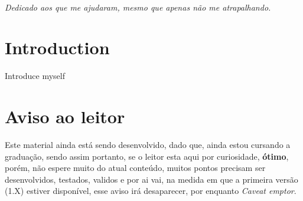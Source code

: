 \documentclass[a4paper, notoc]{tufte-book}
\begin{document}

\tableofcontents %


\listoffigures %


\listoftables %


\cleardoublepage
~\vfill
\begin{doublespace}
\noindent\fontsize{18}{22}\selectfont\itshape
\nohyphenation
Dedicado aos que me ajudaram, mesmo que apenas não me atrapalhando.
\end{doublespace}
\vfill
\vfill


\cleardoublepage
\chapter*{Introduction} %
Introduce myself


\cleardoublepage
\chapter*{Aviso ao leitor}
Este material ainda está sendo desenvolvido, dado que, ainda estou cursando a
graduação, sendo assim portanto, se o leitor esta aqui por curiosidade,
\textbf{ótimo}, porém, não espere muito do atual conteúdo, muitos pontos
precisam ser desenvolvidos, testados, validos e por ai vai, na medida em que a
primeira versão (1.X) estiver disponível, esse aviso irá desaparecer, por
enquanto \emph{Caveat emptor}.

\end{document}
